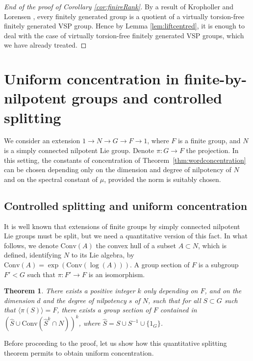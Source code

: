 \documentclass[11pt,leqno]{article}
\theoremstyle{plain}
\newtheorem{theorem}{Theorem}[section]
\theoremstyle{definition}
\theoremstyle{remark}
\numberwithin{equation}{section}
\begin{document}
\begin{proof}[End of the proof of Corollary \ref{cor:finireRank}]
By a result of Kropholler and Lorensen \cite{KroLor}, every finitely generated  group is a quotient of a virtually torsion-free finitely generated VSP group. Hence by Lemma \ref{lem:liftcentred}, it is enough to deal with the case of virtually torsion-free finitely generated VSP groups, which we have already treated.
\end{proof}


\section{Uniform concentration in finite-by-nilpotent groups and controlled splitting}\label{sec:split}

We consider an extension $1\to N\to G\to F\to 1$, where $F$ is a finite group, and $N$ is a simply connected nilpotent Lie group. Denote $\pi:G\to F$ the projection. In this setting, the constants of concentration of Theorem~\ref{thm:wordconcentration} can be chosen depending only on the dimension and degree of nilpotency of $N$ and on the spectral constant of $\mu$, provided the norm is suitably chosen.

\subsection{Controlled splitting and uniform concentration}

It is well known that extensions of finite groups by simply connected nilpotent Lie groups must be split, but we need a quantitative version of this fact.
In what follows, we denote $\text{Conv}(A)$ the convex hull of a subset $A\subset N$, which is defined, identifying $N$ to its Lie algebra, by $\mathrm{Conv}(A)=\exp(\mathrm{Conv}(\log(A)))$.  A group section of $F$ is a subgroup $F'<G$  such that $\pi:F'\to F$ is an isomorphism. 


\begin{theorem}\label{thm:QuantSplit}
There exists  a positive integer $k$ only depending on $F$, and on the dimension $d$ and the degree of nilpotency $s$ of $N$, such that for all $S\subset G$ such that  $\langle\pi(S)\rangle=F$, there exists a group section of $F$ contained in $(\widehat{S}\cup\mathrm{Conv}(\widehat{S}^{k}\cap N))^k$, where $\widehat{S}=S\cup S^{-1}\cup \{1_G\}$. 
\end{theorem}

Before proceeding to the proof, let us show how this quantitative splitting theorem permits to obtain uniform concentration.
\end{document}
